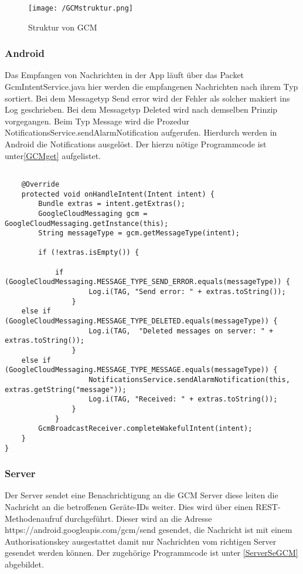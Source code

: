 \begin{figure}[H]
\centering
\texttt{[image: /GCMstruktur.png]}
\caption{Struktur von GCM}
\label{fig:GCMstrukutr}
\end{figure}

\subsubsection{Android}
Das Empfangen von Nachrichten in der App läuft über das Packet GcmIntentService.java hier werden die empfangenen Nachrichten nach ihrem Typ sortiert. Bei dem Messagetyp Send error wird der Fehler als solcher makiert ins Log geschrieben. Bei dem Messagetyp Deleted wird nach demselben Prinzip vorgegangen. Beim Typ Message wird die Prozedur NotificationsService.sendAlarmNotification aufgerufen. Hierdurch werden in Android die Notifications ausgelöst. Der hierzu nötige Programmcode ist unter\ref{GCMget} aufgelistet.\\

\begin{lstlisting}[caption={Empfangen von GCM Nachrichten unter Android},label=lst:GCMget]

    @Override
    protected void onHandleIntent(Intent intent) {
        Bundle extras = intent.getExtras();
        GoogleCloudMessaging gcm = GoogleCloudMessaging.getInstance(this);
        String messageType = gcm.getMessageType(intent);

        if (!extras.isEmpty()) {

            if (GoogleCloudMessaging.MESSAGE_TYPE_SEND_ERROR.equals(messageType)) {
            		Log.i(TAG, "Send error: " + extras.toString());
	            }
 	else if (GoogleCloudMessaging.MESSAGE_TYPE_DELETED.equals(messageType)) {
            		Log.i(TAG,  "Deleted messages on server: " + extras.toString());
            	}
	else if (GoogleCloudMessaging.MESSAGE_TYPE_MESSAGE.equals(messageType)) {
            		NotificationsService.sendAlarmNotification(this, extras.getString("message"));
                	Log.i(TAG, "Received: " + extras.toString());
            	}
        	}
        GcmBroadcastReceiver.completeWakefulIntent(intent);
	} 
}

\end{lstlisting}

\subsubsection{Server}
Der Server sendet eine Benachrichtigung an die GCM Server diese leiten die Nachricht an die betroffenen Geräte-IDs weiter. Dies wird über einen REST-Methodenaufruf durchgeführt. Dieser wird an die Adresse https://android.googleapis.com/gcm/send gesendet, die Nachricht ist mit einem Authorisationskey ausgestattet damit nur Nachrichten vom richtigen Server gesendet werden können. Der zugehörige Programmcode ist unter \ref{ServerSeGCM} abgebildet.

